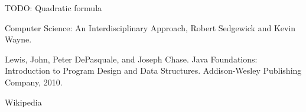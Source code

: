 \begin{exercise}
TODO: Quadratic formula
\end{exercise}


Computer Science: An Interdisciplinary Approach, Robert Sedgewick and Kevin Wayne.

Lewis, John, Peter DePasquale, and Joseph Chase. Java Foundations: Introduction to Program Design and Data Structures. Addison-Wesley Publishing Company, 2010.

Wikipedia

